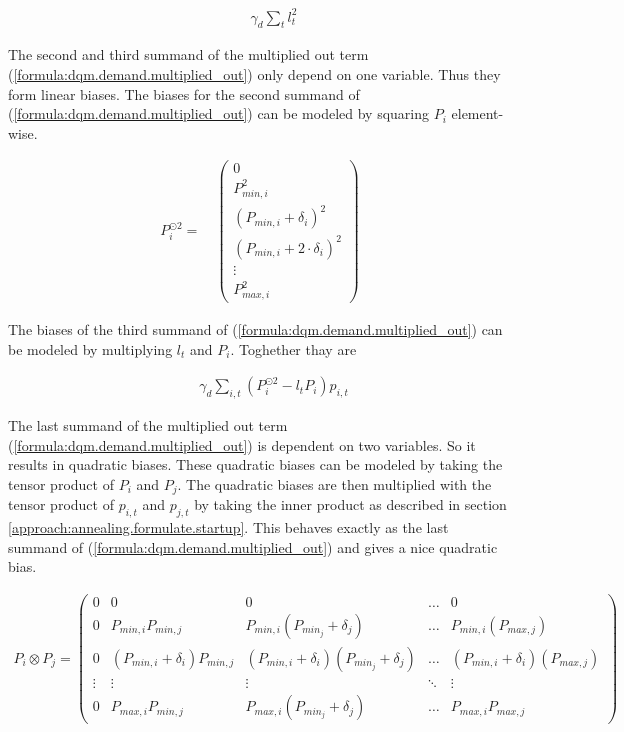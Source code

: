 \begin{align}
  \qquad
  \gamma_d \sum_t l_t^2
\end{align}

The second and third summand of the multiplied out term (\ref{formula:dqm.demand.multiplied_out}) only depend on one variable.
Thus they form linear biases.
The biases for the second summand of (\ref{formula:dqm.demand.multiplied_out}) can be modeled by squaring $P_i$ element-wise.

\begin{align}
  P_i^{\odot 2} = \quad \begin{pmatrix}
    0 \\
    P_{min, i}^2 \\
    \left( P_{min, i} + \delta_i \right)^2 \\
    \left( P_{min, i} + 2 \cdot \delta_i \right)^2 \\
    \vdots \\
    P_{max, i}^2
  \end{pmatrix}
\end{align}

The biases of the third summand of (\ref{formula:dqm.demand.multiplied_out}) can be modeled by multiplying $l_t$ and $P_i$.
Toghether thay are

\begin{align}
  \qquad
  \gamma_d \sum_{i, t} \left( P_i^{\odot 2} - l_t P_i \right) p_{i, t}
\end{align}

The last summand of the multiplied out term (\ref{formula:dqm.demand.multiplied_out}) is dependent on two variables.
So it results in quadratic biases.
These quadratic biases can be modeled by taking the tensor product of $P_i$ and $P_j$.
The quadratic biases are then multiplied with the tensor product of $p_{i, t}$ and $p_{j, t}$ by taking the inner product as described in section \ref{approach:annealing.formulate.startup}.
This behaves exactly as the last summand of (\ref{formula:dqm.demand.multiplied_out}) and gives a nice quadratic bias.

\begin{align}
  P_i \otimes P_j = \begin{pmatrix}
    0 & 0 & 0 & \ldots & 0 \\
    0 & P_{min, i} P_{min, j} & P_{min, i} \left( P_{min_j} + \delta_j \right) & \ldots & P_{min, i} \left( P_{max, j} \right) \\
    0 & \left( P_{min, i} + \delta_i \right) P_{min, j} & \left( P_{min, i} + \delta_i \right) \left( P_{min_j} + \delta_j \right) & \ldots & \left( P_{min, i} + \delta_i \right) \left( P_{max, j} \right) \\
    \vdots & \vdots & \vdots & \ddots & \vdots \\
    0 & P_{max, i} P_{min, j} & P_{max, i} \left( P_{min_j} + \delta_j \right) & \ldots & P_{max, i} P_{max, j}
  \end{pmatrix}
\end{align}

